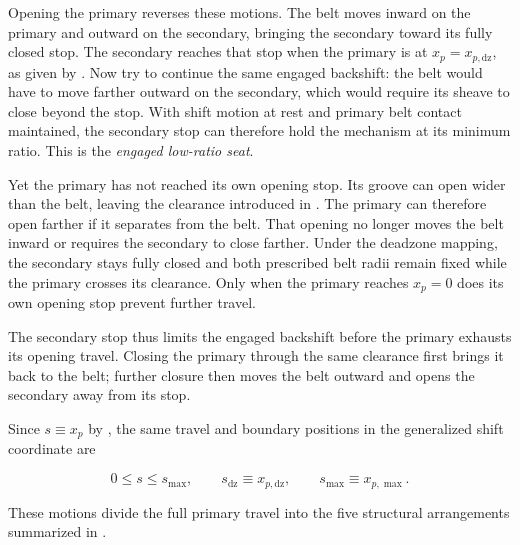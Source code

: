 \documentclass[11pt]{report}
\numberwithin{equation}{section}
\begin{document}
Opening the primary reverses these motions. The belt moves inward on the
primary and outward on the secondary, bringing the secondary toward its
fully closed stop. The secondary reaches that stop when the primary is at
\(x_p=x_{p,\mathrm{dz}}\), as given by
. Now try to continue the same engaged
backshift: the belt would have to move farther outward on the secondary,
which would require its sheave to close beyond the stop. With shift motion
at rest and primary belt contact maintained, the secondary stop can therefore
hold the mechanism at its minimum ratio. This is the
\emph{engaged low-ratio seat}.

Yet the primary has not reached its own opening stop. Its groove can open
wider than the belt, leaving the clearance introduced in
. The primary can therefore open farther
if it separates from the belt. That opening no longer moves the belt inward
or requires the secondary to close farther. Under the deadzone mapping, the
secondary stays fully closed and both prescribed belt radii remain fixed
while the primary crosses its clearance. Only when the primary reaches
\(x_p=0\) does its own opening stop prevent further travel.

The secondary stop thus limits the engaged backshift before the primary
exhausts its opening travel. Closing the primary through the same clearance
first brings it back to the belt; further closure then moves the belt outward
and opens the secondary away from its stop.

Since \(s\equiv x_p\) by , the same travel
and boundary positions in the generalized shift coordinate are

\begin{equation}
    0\leq s\leq s_{\max},
    \qquad
    s_{\mathrm{dz}}\equiv x_{p,\mathrm{dz}},
    \qquad
    s_{\max}\equiv x_{p,\max}.
    \label{eq:shift_operating_domain}
\end{equation}

These motions divide the full primary travel into the five structural
arrangements summarized in
.
\end{document}
